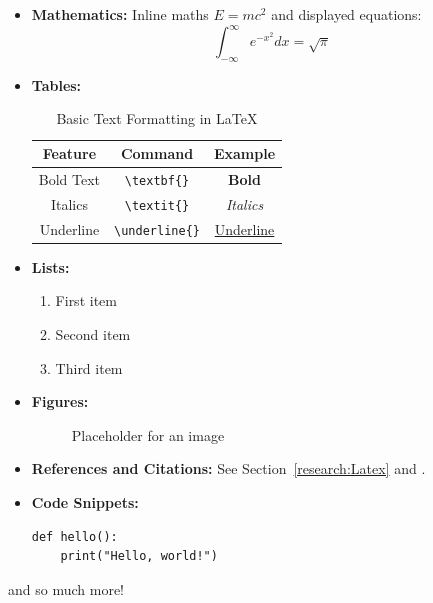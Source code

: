 \begin{itemize}
    \item \textbf{Mathematics:} Inline maths $E=mc^2$ and displayed equations:
    \begin{equation}
        \int_{-\infty}^{\infty} e^{-x^2} dx = \sqrt{\pi}
    \end{equation}
    
    \item \textbf{Tables:}
    \begin{table}[h!]
        \centering
        \begin{tabular}{|c|c|c|}
            \hline
            \textbf{Feature} & \textbf{Command} & \textbf{Example} \\
            \hline
            Bold Text & \verb|\textbf{}| & \textbf{Bold} \\
            Italics & \verb|\textit{}| & \textit{Italics} \\
            Underline & \verb|\underline{}| & \underline{Underline} \\
            \hline
        \end{tabular}
        \caption{Basic Text Formatting in \LaTeX{}}
    \end{table}
    
    \item \textbf{Lists:}
    \begin{enumerate}
        \item First item
        \item Second item
        \item Third item
    \end{enumerate}
    
    \item \textbf{Figures:}
    \begin{figure}[h!]
        \centering
        \fbox{\rule{0pt}{2in} \rule{2in}{0pt}}
        \caption{Placeholder for an image}
    \end{figure}
    
    \item \textbf{References and Citations:} See Section~\ref{research:Latex} and \cite{DocumentationOverleafOnline}.
    
    \item \textbf{Code Snippets:}
    \begin{verbatim}
def hello():
    print("Hello, world!")
    \end{verbatim}
\end{itemize}
and so much more!